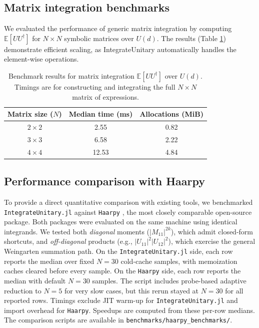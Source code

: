\documentclass[manuscript,screen]{acmart}
\begin{document}
\subsection{Matrix integration benchmarks}
We evaluated the performance of generic matrix integration by computing
$\mathbb{E}[U U^\dagger]$ for $N \times N$ symbolic matrices over $U(d)$. The
results (Table \ref{tab:matrix_bench}) demonstrate efficient scaling, as IntegrateUnitary
automatically handles the element-wise operations.

\begin{table}[h]
\centering
\caption{Benchmark results for matrix integration $\mathbb{E}[U U^\dagger]$ over
$U(d)$. Timings are for constructing and integrating the full $N \times N$
matrix of expressions.}
\label{tab:matrix_bench}
\begin{tabular}{ccc}
\hline
Matrix size ($N$) & Median time (ms) & Allocations (MiB) \\
\hline
$2 \times 2$ & 2.55 & 0.82 \\
$3 \times 3$ & 6.58 & 2.22 \\
$4 \times 4$ & 12.53 & 4.84 \\
\hline
\end{tabular}
\end{table}

\subsection{Performance comparison with Haarpy}
\label{sec:haarpy_comparison}
To provide a direct quantitative comparison with existing tools, we benchmarked
\texttt{IntegrateUnitary.jl} against \texttt{Haarpy} \cite{cardin2024haarpy}, the most
closely comparable open-source package. Both packages were evaluated on the same
machine using identical integrands. We tested both \emph{diagonal} moments
($|M_{11}|^{2k}$), which admit closed-form shortcuts, and \emph{off-diagonal}
products (e.g., $|U_{11}|^2|U_{12}|^2$), which exercise the general Weingarten
summation path. On the \texttt{IntegrateUnitary.jl} side, each row reports the median over
fixed $N=30$ cold-cache samples, with memoization caches cleared before every
sample. On the \texttt{Haarpy} side, each row reports the median with default
$N=30$ samples. The script includes probe-based adaptive reduction to $N=5$
for very slow cases, but this rerun stayed at $N=30$ for all reported rows.
Timings exclude JIT warm-up for \texttt{IntegrateUnitary.jl} and import overhead for
\texttt{Haarpy}. Speedups are computed from these per-row medians. The
comparison scripts are available in
\texttt{benchmarks/haarpy\_benchmarks/}.
\end{document}
